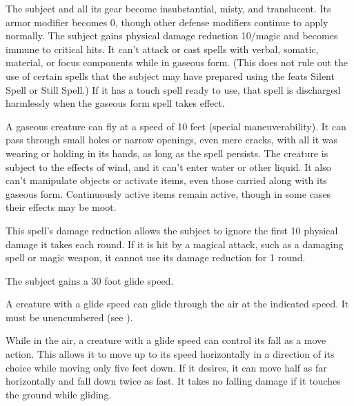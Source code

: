 \spelldur{\durshort \dismissable}
\begin{spelleffect}
    The subject and all its gear become insubstantial, misty, and translucent. Its armor modifier becomes 0, though other defense modifiers continue to apply normally. The subject gains physical damage reduction 10/magic and becomes immune to critical hits. It can't attack or cast spells with verbal, somatic, material, or focus components while in gaseous form. (This does not rule out the use of certain spells that the subject may have prepared using the feats Silent Spell or Still Spell.) If it has a touch spell ready to use, that spell is discharged harmlessly when the gaseous form spell takes effect.
    \par A gaseous creature can fly at a speed of 10 feet (special maneuverability). It can pass through small holes or narrow openings, even mere cracks, with all it was wearing or holding in its hands, as long as the spell persists. The creature is subject to the effects of wind, and it can't enter water or other liquid. It also can't manipulate objects or activate items, even those carried along with its gaseous form. Continuously active items remain active, though in some cases their effects may be moot.
\end{spelleffect}
\begin{spellnotes}
    This spell's damage reduction allows the subject to ignore the first 10 physical damage it takes each round. If it is hit by a magical attack, such as a damaging spell or magic weapon, it cannot use its damage reduction for 1 round.
\end{spellnotes}

\spelldur{\durlong}
\begin{spelleffect}
    The subject gains a 30 foot glide speed.
\end{spelleffect}
\begin{spellnotes}
    A creature with a glide speed can glide through the air at the indicated speed. It must be unencumbered (see ).

    While in the air, a creature with a glide speed can control its fall as a move action. This allows it to move up to its speed horizontally in a direction of its choice while moving only five feet down. If it desires, it can move half as far horizontally and fall down twice as fast. It takes no falling damage if it touches the ground while gliding.
\end{spellnotes}

